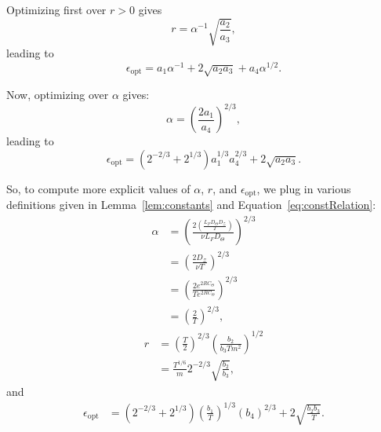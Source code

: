 \documentclass[twoside]{article}
\theoremstyle{definition}
\newcommand{\cZ}{\mathcal{Z}}
\newcommand{\1}[1]{\scalebox{1.25}{$\mathds{1}$}\left[#1\right]}
\begin{document}
Optimizing first over $r>0$ gives 
$$
r=\alpha^{-1}\sqrt{\frac{a_2}{a_3}},
$$
leading to 
$$
\epsilon_{\mathrm{opt}}=a_1 \alpha^{-1}+2\sqrt{a_2 a_3}+a_4 \alpha^{1/2}.
$$

Now, optimizing over $\alpha$ gives:
\begin{equation*}
\alpha = \left(\frac{2 a_1}{a_4}\right)^{2/3},
\end{equation*}
leading to 
$$
\epsilon_{\mathrm{opt}}=\left(2^{-2/3}+2^{1/3}\right)a_1^{1/3}a_4^{2/3}+2\sqrt{a_2a_3}.
$$

So, to compute more explicit values of $\alpha$, $r$, and $\epsilon_{\mathrm{opt}}$,
we  plug in various definitions given in Lemma~\ref{lem:constants} and Equation~\ref{eq:constRelation}:
\begin{align*}
\alpha &=\left(\frac{2\left(\frac{L_FD_{\Theta}D_{\cZ}}{T}\right)}{\nu L_F D_{\Theta}} \right)^{2/3} \\
&=\left(\frac{2D_{\cZ}}{\nu T}\right)^{2/3}\\
&=
\left(\frac{2e^{2RC_{\Theta}}}{Te^{2RC_{\Theta}}}\right)^{2/3}\\
&=\left(\frac{2}{T}\right)^{2/3},
\end{align*}
\begin{align*}
r&=\left(\frac{T}{2}\right)^{2/3}
\left(\frac{b_2}{b_3 Tm^2}\right)^{1/2}\\
&= \frac{T^{1/6}}{m } 2^{-2/3} \sqrt{\frac{b_2}{b_3}},
\end{align*}
and
\begin{align*}
\epsilon_{\mathrm{opt}}&=
\left(2^{-2/3}+2^{1/3}\right)\left(\frac{b_1}{T}\right)^{1/3}\left(b_4\right)^{2/3}+2\sqrt{\frac{b_2 b_3}{T}}.
\end{align*}
\end{document}
